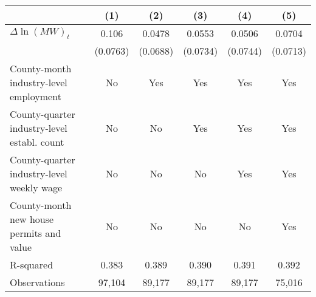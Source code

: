 {
\def\sym#1{\ifmmode^{#1}\else\(^{#1}\)\fi}
\begin{tabular}{l*{5}{c}}
\hline\hline
          &\multicolumn{1}{c}{(1)}         &\multicolumn{1}{c}{(2)}         &\multicolumn{1}{c}{(3)}         &\multicolumn{1}{c}{(4)}         &\multicolumn{1}{c}{(5)}         \\
\hline
$\Delta \ln(MW)_{t}$&    0.106         &   0.0478         &   0.0553         &   0.0506         &   0.0704         \\
          & (0.0763)         & (0.0688)         & (0.0734)         & (0.0744)         & (0.0713)         \\
\hline
County-month industry-level employment&       No         &      Yes         &      Yes         &      Yes         &      Yes         \\
County-quarter industry-level establ. count&       No         &       No         &      Yes         &      Yes         &      Yes         \\
County-quarter industry-level weekly wage&       No         &       No         &       No         &      Yes         &      Yes         \\
County-month new house permits and value&       No         &       No         &       No         &       No         &      Yes         \\
R-squared &    0.383         &    0.389         &    0.390         &    0.391         &    0.392         \\
Observations&   97,104         &   89,177         &   89,177         &   89,177         &   75,016         \\
\hline\hline
\end{tabular}
}
